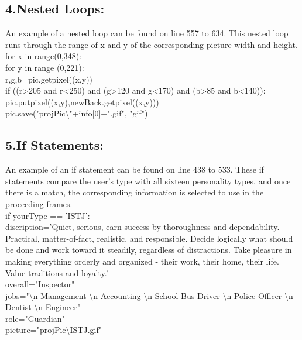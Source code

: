 \documentclass[11pt]{article}%
\begin{document}
\subsection*{4.Nested Loops:}
An example of a nested loop can be found on line 557 to 634. This nested loop runs through the range of x and y of the corresponding picture width and height.\\
\indent for x in range(0,348):\\
\indent \indent for y in range (0,221):\\
\indent \indent \indent r,g,b=pic.getpixel((x,y))\\
\indent \indent \indent if ((r\textgreater205 and r\textless250) and (g\textgreater120 and g\textless170) and (b\textgreater85 and b\textless140)):\\
\indent \indent \indent \indent pic.putpixel((x,y),newBack.getpixel((x,y)))\\
\indent \indent pic.save("projPic\textbackslash"+info[0]+".gif", "gif")
 
\subsection*{5.If Statements:}
An example of an if statement can be found on line 438 to 533. These if statements compare the user’s type with all sixteen personality types, and once there is a match, the corresponding information is selected to use in the proceeding frames.\\
\indent if yourType == 'ISTJ':\\
\indent \indent discription='Quiet, serious, earn success by thoroughness and dependability. Practical, matter-of-fact, realistic, and responsible. Decide logically what should be done and work toward it steadily, regardless of distractions. Take pleasure in making everything orderly and organized - their work, their home, their life. Value traditions and loyalty.'\\
\indent \indent overall="Inspector"\\
\indent \indent jobs="\textbackslash n Management \textbackslash n Accounting \textbackslash n School Bus Driver \textbackslash n Police Officer \textbackslash n Dentist \textbackslash n Engineer"\\
\indent \indent role="Guardian"\\
\indent \indent picture="projPic\textbackslash ISTJ.gif"\\
\end{document}
